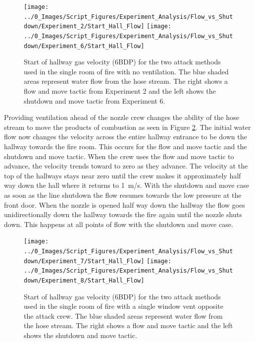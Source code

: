 \documentclass[12pt,oneside]{book}
\begin{document}
\begin{figure}[H]
\centering
\texttt{[image: ../0\_Images/Script\_Figures/Experiment\_Analysis/Flow\_vs\_Shutdown/Experiment\_2/Start\_Hall\_Flow]}
\texttt{[image: ../0\_Images/Script\_Figures/Experiment\_Analysis/Flow\_vs\_Shutdown/Experiment\_6/Start\_Hall\_Flow]}
\caption[Single Room - No Vent - Flow \& Move vs. Shutdown \& Move - Airflow]{Start of hallway gas velocity (6BDP) for the two attack methods used in the single room of fire with no ventilation. The blue shaded areas represent water flow from the hose stream. The right shows a flow and move tactic from Experiment 2 and the left shows the shutdown and move tactic from Experiment 6.}
\label{fig:Flow_vs_Shut_Single_No_Vent_Velocity}
\end{figure}

Providing ventilation ahead of the nozzle crew changes the ability of the hose stream to move the products of combustion as seen in Figure \ref{fig:Flow_vs_Shut_Single_Vent_Velocity}. The initial water flow now changes the velocity across the entire hallway entrance to be down the hallway towards the fire room. This occurs for the flow and move tactic and the shutdown and move tactic. When the crew uses the flow and move tactic to advance, the velocity trends toward to zero as they advance. The velocity at the top of the hallways stays near zero until the crew makes it approximately half way down the hall where it returns to 1~m/s. With the shutdown and move case as soon as the line shutdown the flow resumes towards the low pressure at the front door. When the nozzle is opened half way down the hallway the flow goes unidirectionally down the hallway towards the fire again until the nozzle shuts down. This happens at all points of flow with the shutdown and move case.

\begin{figure}[H]
\centering
\texttt{[image: ../0\_Images/Script\_Figures/Experiment\_Analysis/Flow\_vs\_Shutdown/Experiment\_7/Start\_Hall\_Flow]}
\texttt{[image: ../0\_Images/Script\_Figures/Experiment\_Analysis/Flow\_vs\_Shutdown/Experiment\_8/Start\_Hall\_Flow]}
\caption[Single Room - Window Vent Opposite - Flow \& Move vs. Shutdown \& Move - Airflow]{Start of hallway gas velocity (6BDP) for the two attack methods used in the single room of fire with a single window vent opposite the attack crew. The blue shaded areas represent water flow from the hose stream. The right shows a flow and move tactic and the left shows the shutdown and move tactic.}
\label{fig:Flow_vs_Shut_Single_Vent_Velocity}
\end{figure}
\end{document}

